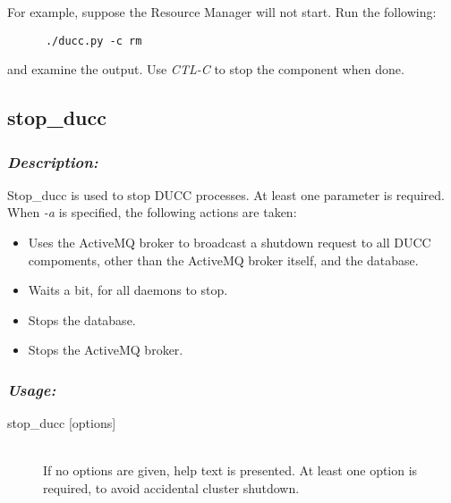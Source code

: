       For example, suppose the Resource Manager will not start.  Run the following:
\begin{verbatim}
      ./ducc.py -c rm
\end{verbatim}
      and examine the output.  Use {\em CTL-C} to stop the component when done.
      

\subsection{stop\_ducc}
\label{subsec:admin.stop-ducc}

    \subsubsection{{\em Description:}}
    Stop\_ducc is used to stop DUCC processes. At least one parameter is required.
    When {\em -a} is specified, the following actions are taken:
    \begin{itemize}
       \item Uses the ActiveMQ broker to broadcast a shutdown request to all
        DUCC compoments, other than the ActiveMQ broker itself, and the database.
      \item Waits a bit, for all daemons to stop.
      \item Stops the database.
      \item Stops the ActiveMQ broker.
    \end{itemize}


    \subsubsection{\em Usage:}

    \begin{description}
      \item[stop\_ducc {[options]}] \hfill \\ 
        If no options are given, help text is presented. At least one option is required, to avoid 
        accidental cluster shutdown. 
      \end{description}
    

